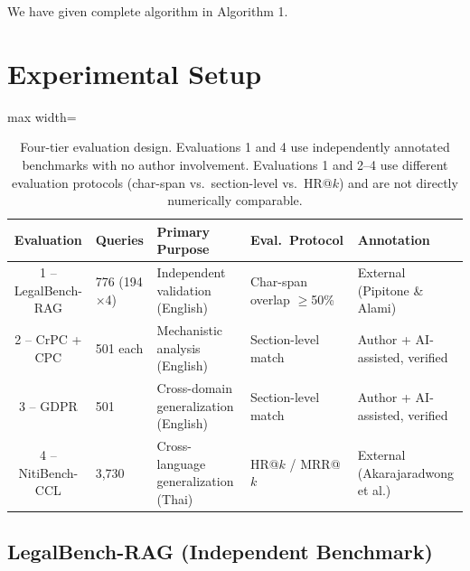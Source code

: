 \documentclass[sn-mathphys,Numbered]{sn-jnl}%
\begin{document}
We have given complete algorithm in Algorithm 1.
\section{Experimental Setup}
\label{sec:setup}


\begin{table}[htbp]
\centering
\small
\begin{adjustbox}{max width=\textwidth}
\begin{tabular}{clp{3.0cm}p{2.8cm}p{2.8cm}}
\toprule
\textbf{Evaluation} & \textbf{Queries} & \textbf{Primary Purpose}
               & \textbf{Eval.\ Protocol} & \textbf{Annotation} \\
\midrule
1 -- LegalBench-RAG
  & 776 (194$\times$4)
  & Independent validation (English)
  & Char-span overlap $\geq$50\%
  & External (Pipitone \& Alami) \\
2 -- CrPC + CPC
  & 501 each
  & Mechanistic analysis (English)
  & Section-level match
  & Author + AI-assisted, verified \\
3 -- GDPR
  & 501
  & Cross-domain generalization (English)
  & Section-level match
  & Author + AI-assisted, verified \\
4 -- NitiBench-CCL
  & 3,730
  & Cross-language generalization (Thai)
  & HR@$k$ / MRR@$k$
  & External (Akarajaradwong et al.) \\
\bottomrule
\end{tabular}
\end{adjustbox}
\caption{Four-tier evaluation design. Evaluations 1 and 4 use independently
  annotated benchmarks with no author involvement.  Evaluations 1 and 2--4 use
  different evaluation protocols (char-span vs.\ section-level vs.\ HR@$k$)
  and are not directly numerically comparable.}
\label{tab:layers}
\end{table}


\subsection{LegalBench-RAG (Independent Benchmark)}
\end{document}
